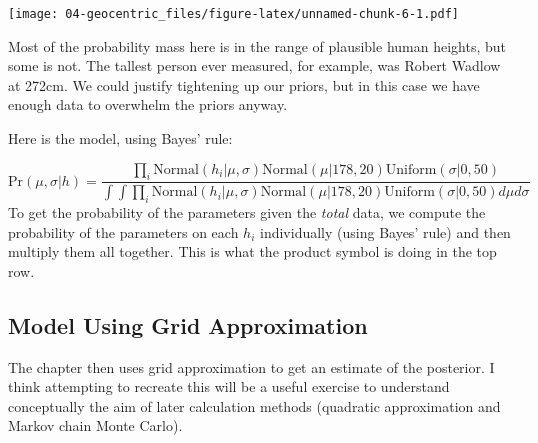 \documentclass[
]{book}
\begin{document}
\texttt{[image: 04-geocentric\_files/figure-latex/unnamed-chunk-6-1.pdf]}

Most of the probability mass here is in the range of plausible human heights, but some is not. The tallest person ever measured, for example, was Robert Wadlow at 272cm. We could justify tightening up our priors, but in this case we have enough data to overwhelm the priors anyway.

Here is the model, using Bayes' rule:

\[
\text{Pr}(\mu, \sigma | h) = \frac{\prod_i \text{Normal}(h_i | \mu, \sigma) \text{Normal}(\mu | 178, 20) \text{Uniform}(\sigma |0 ,50) }{\int \int \prod_i \text{Normal}(h_i | \mu, \sigma) \text{Normal}(\mu | 178, 20) \text{Uniform}(\sigma |0 ,50) d\mu d\sigma}
\]
To get the probability of the parameters given the \emph{total} data, we compute the probability of the parameters on each \(h_i\) individually (using Bayes' rule) and then multiply them all together. This is what the product symbol is doing in the top row.

\hypertarget{model-using-grid-approximation}{%
\subsection{Model Using Grid Approximation}\label{model-using-grid-approximation}}

The chapter then uses grid approximation to get an estimate of the posterior. I think attempting to recreate this will be a useful exercise to understand conceptually the aim of later calculation methods (quadratic approximation and Markov chain Monte Carlo).
\end{document}
